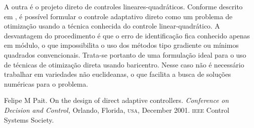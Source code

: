 \documentclass{tufte-handout}
\begin{document}
A outra é o projeto direto de controles lineares-quadráticos. Conforme descrito em \cite{design-direct}, é possível formular o   controle adaptativo direto como um problema de otimização usando a técnica conhecida do controle linear-quadrático. A desvantagem do procedimento é que o erro de identificação fica conhecido apenas em módulo, o que impossibilita o uso dos métodos tipo gradiente ou mínimos quadrados convencionais. Trata-se portanto de uma formulação ideal para o uso de técnicas de otimização direta usando baricentro. Nesse caso não é necessário trabalhar em variedades não euclideanas, o que facilita a busca de soluções numéricas para o problema.

Felipe M Pait.
On the design of direct adaptive controllers. \textsl{Conference on Decision and Control,} Orlando, Florida, \textsc{usa}, December 2001. \textsc{ieee} Control Systems Society.
\end{document}
